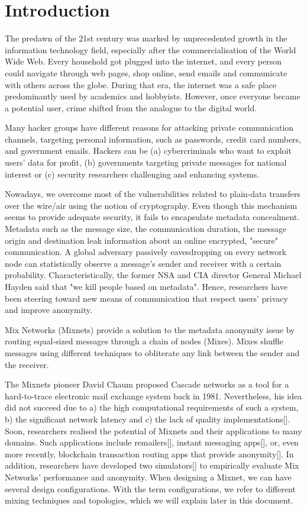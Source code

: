 \documentclass[logo,msc,cyber]{infthesis}   %
\begin{document}
\chapter{Introduction}

The predawn of the 21st century was marked by unprecedented growth in the
information technology field, especially after the commercialisation of the
World Wide Web. Every household got plugged into the internet, and every person
could navigate through web pages, shop online, send emails and communicate with
others across the globe. During that era, the internet was a safe place
predominantly used by academics and hobbyists. However, once everyone became a
potential user, crime shifted from the analogue to the digital world.

Many hacker groups have different reasons for attacking private communication
channels, targeting personal information, such as passwords, credit card
numbers, and government emails. Hackers can be (a) cybercriminals who want to
exploit users' data for profit, (b) governments targeting private messages for
national interest or (c) security researchers challenging and enhancing systems.


Nowadays, we overcome most of the vulnerabilities related to plain-data
transfers over the wire/air using the notion of cryptography. Even though this
mechanism seems to provide adequate security, it fails to encapsulate metadata
concealment. Metadata such as the message size, the communication duration, the
message origin and destination leak information about an online encrypted,
"secure" communication. A global adversary passively eavesdropping on every
network node can statistically observe a message's sender and receiver with a
certain probability. Characteristically, the former NSA and CIA director General
Michael Hayden said that "we kill people based on metadata". Hence, researchers
have been steering toward new means of communication that respect users' privacy
and improve anonymity.

Mix Networks (Mixnets) provide a solution to the metadata anonymity issue by
routing equal-sized messages through a chain of nodes (Mixes). Mixes shuffle
messages using different techniques to obliterate any link between the sender
and the receiver. 

The Mixnets pioneer David Chaum proposed Cascade networks as a tool for a
hard-to-trace electronic mail exchange system back in 1981. Nevertheless, his
idea did not succeed due to a) the high computational requirements of such a
system, b) the significant network latency and c) the lack of quality
implementations[]. Soon, researchers realised the potential of Mixnets and
their applications to many domains. Such applications include remailers[],
instant messaging apps[], or, even more recently, blockchain transaction routing
apps that provide anonymity[]. In addition, researchers have developed two
simulators[] to empirically evaluate Mix Networks' performance and anonymity.
When designing a Mixnet, we can have several design configurations. With the
term configurations, we refer to different mixing techniques and topologies,
which we will explain later in this document.
\end{document}
